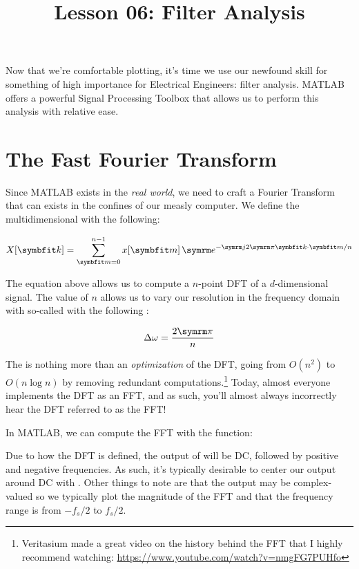 \documentclass{article}
\title{Lesson 06: Filter Analysis}
\begin{document}
\renderTitle

Now that we're comfortable plotting, it's time we use our newfound skill
for something of high importance for Electrical Engineers: filter
analysis.  MATLAB offers a powerful Signal Processing Toolbox that allows us to
perform this analysis with relative ease.

\section{The Fast Fourier Transform}

Since MATLAB exists in the \emph{real world}, we need to craft a Fourier
Transform that can exists in the confines of our measly computer.  We
define the multidimensional 
with the following:

\begin{equation}
	X[\mat{k}]
	=
	\sum^{n - 1}_{\mat{m} = 0}
	x[\mat{m}]\,\e^{-\im 2\cpi \mat{k} \cdot \mat{m} / n}
\end{equation}

The equation above allows us to compute a \(n\)-point DFT of a
\(d\)-dimensional signal.  The value of \(n\) allows us to vary our
resolution in the frequency domain with so-called  with the following :


\begin{equation}
	\Delta \omega = \frac{2\cpi}{n}
\end{equation}

The  is nothing more than an
\emph{optimization} of the DFT, going from \(O(n^2)\) to \(O(n\log n)\)
by removing redundant computations.\footnote{Veritasium made a great
video on the history behind the FFT that I highly recommend watching:
\url{https://www.youtube.com/watch?v=nmgFG7PUHfo}}  Today, almost
everyone implements the DFT as an FFT, and as such, you'll almost always
incorrectly hear the DFT referred to as the FFT!

In MATLAB, we can compute the FFT with the  function:


Due to how the DFT is defined, the output of  will be DC, followed by
positive and negative frequencies.  As such, it's typically desirable to
center our output around DC with .  Other things to note are
that the output may be complex-valued so we typically plot the magnitude
of the FFT and that the frequency range is from \(-f_s/2\) to \(f_s/2\).
\end{document}
